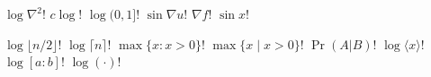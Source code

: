 \documentclass{article}
\begin{document}
$\log\nabla^{2}!$ $c\log!$ $\log(0,1]!$ $\sin\nabla u!$ $\nabla f!$ $\sin x!$

$\log\lfloor n/2\rfloor!$ $\log\lceil n\rceil!$ $\max\{x:x>0\}!$ $\max\{x\mid x>0\}!$ $\Pr(A|B)!$ $\log\langle x\rangle!$
$\log[a:b]!$ $\log(\cdot)!$
\end{document}
